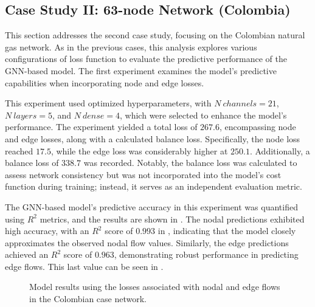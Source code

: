 \subsection{Case Study II: 63-node Network (Colombia)}


This section addresses the second case study, focusing on the Colombian natural gas network. As in the previous cases, this analysis explores various configurations of loss function to evaluate the predictive performance of the GNN-based model. The first experiment examines the model's predictive capabilities when incorporating node and edge losses.

This experiment used optimized hyperparameters, with \( N \ channels = 21 \), \( N \ layers = 5 \), and \( N \ dense = 4 \), which were selected to enhance the model's performance. The experiment yielded a total loss of \( 267.6 \), encompassing node and edge losses, along with a calculated balance loss. Specifically, the node loss reached \( 17.5 \), while the edge loss was considerably higher at \( 250.1 \). Additionally, a balance loss of \( 338.7 \) was recorded. Notably, the balance loss was calculated to assess network consistency but was not incorporated into the model's cost function during training; instead, it serves as an independent evaluation metric. 


The GNN-based model's predictive accuracy in this experiment was quantified using \( R^2 \) metrics, and the results are shown in . The nodal predictions exhibited high accuracy, with an \( R^2 \) score of \( 0.993 \) in , indicating that the model closely approximates the observed nodal flow values. Similarly, the edge predictions achieved an \( R^2 \) score of \( 0.963 \), demonstrating robust performance in predicting edge flows. This last value can be seen in .


\begin{figure}[htbp]
    \centering
    \setlength{}        
    \setlength{} 
    
    \caption{Model results using the losses associated with nodal and edge flows in the Colombian case network.}
    \label{fig:col_base_f_results_non_lineal}
\end{figure}


